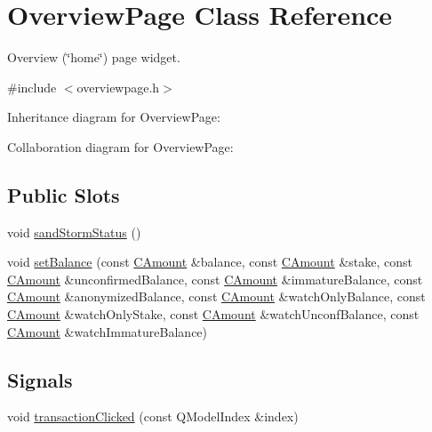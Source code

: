 \hypertarget{class_overview_page}{}\section{Overview\+Page Class Reference}
\label{class_overview_page}


Overview (\char`\"{}home\char`\"{}) page widget.  




{\ttfamily \#include $<$overviewpage.\+h$>$}



Inheritance diagram for Overview\+Page\+:


Collaboration diagram for Overview\+Page\+:
\subsection*{Public Slots}
\begin{DoxyCompactItemize}
\item 
void \hyperlink{class_overview_page_a95da1abd608bd2412b668be43446295a}{sand\+Storm\+Status} ()
\item 
void \hyperlink{class_overview_page_a070a269ea7c7aacf129e6325fcd8343a}{set\+Balance} (const \hyperlink{amount_8h_a4eaf3a5239714d8c45b851527f7cb564}{C\+Amount} \&balance, const \hyperlink{amount_8h_a4eaf3a5239714d8c45b851527f7cb564}{C\+Amount} \&stake, const \hyperlink{amount_8h_a4eaf3a5239714d8c45b851527f7cb564}{C\+Amount} \&unconfirmed\+Balance, const \hyperlink{amount_8h_a4eaf3a5239714d8c45b851527f7cb564}{C\+Amount} \&immature\+Balance, const \hyperlink{amount_8h_a4eaf3a5239714d8c45b851527f7cb564}{C\+Amount} \&anonymized\+Balance, const \hyperlink{amount_8h_a4eaf3a5239714d8c45b851527f7cb564}{C\+Amount} \&watch\+Only\+Balance, const \hyperlink{amount_8h_a4eaf3a5239714d8c45b851527f7cb564}{C\+Amount} \&watch\+Only\+Stake, const \hyperlink{amount_8h_a4eaf3a5239714d8c45b851527f7cb564}{C\+Amount} \&watch\+Unconf\+Balance, const \hyperlink{amount_8h_a4eaf3a5239714d8c45b851527f7cb564}{C\+Amount} \&watch\+Immature\+Balance)
\end{DoxyCompactItemize}
\subsection*{Signals}
\begin{DoxyCompactItemize}
\item 
void \hyperlink{class_overview_page_aa75e17f571b13dfcdd6f5251cbfe966d}{transaction\+Clicked} (const Q\+Model\+Index \&index)
\end{DoxyCompactItemize}
